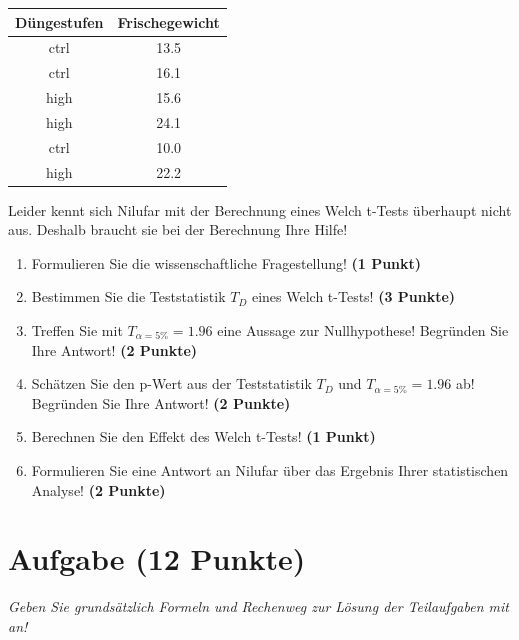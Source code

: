 \documentclass[a4paper, 9pt]{scrartcl}\usepackage[]{graphicx}\usepackage[]{xcolor}
\begin{document}
\begin{table}[!h]
\centering
\begin{tabular}{cc}
\toprule
Düngestufen & Frischegewicht\\
\midrule
ctrl & 13.5\\
ctrl & 16.1\\
high & 15.6\\
high & 24.1\\
ctrl & 10.0\\
\addlinespace
high & 22.2\\
\bottomrule
\end{tabular}
\end{table}



Leider kennt sich Nilufar mit der Berechnung eines Welch t-Tests überhaupt nicht aus. Deshalb braucht sie bei der Berechnung Ihre Hilfe!

\begin{enumerate}
  \item Formulieren Sie die wissenschaftliche Fragestellung! \textbf{(1 Punkt)}
  \item Bestimmen Sie die Teststatistik $T_{D}$ eines Welch t-Tests! \textbf{(3 Punkte)}
  \item Treffen Sie mit $T_{\alpha = 5\%} = 1.96$ eine Aussage zur Nullhypothese! Begründen Sie Ihre Antwort! \textbf{(2 Punkte)}
  \item Schätzen Sie den p-Wert aus der Teststatistik $T_{D}$ und $T_{\alpha = 5\%} = 1.96$ ab! Begründen Sie Ihre Antwort! \textbf{(2 Punkte)}
  \item Berechnen Sie den Effekt des Welch t-Tests! \textbf{(1 Punkt)}
  \item Formulieren Sie eine Antwort an Nilufar über das Ergebnis Ihrer statistischen Analyse! \textbf{(2 Punkte)}
\end{enumerate} 
\clearpage

\section{Aufgabe \hfill (12 Punkte)}

\textit{Geben Sie grundsätzlich Formeln und Rechenweg zur Lösung der Teilaufgaben mit an!} \\[1Ex]
 
\end{document}
